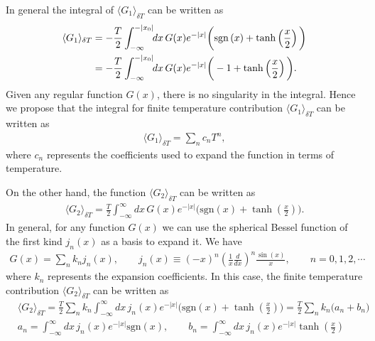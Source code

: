 \documentclass[sn-mathphys,Numbered]{sn-jnl}
\begin{document}
In general the integral of $\langle G_1\rangle_{\delta T}$ can be written as
\begin{align}
\langle G_1\rangle_{\delta T}&=-\frac{T}{2}\int^{-|x_0|}_{-\infty}\!\!dx\,G(x) e^{-|x|}\bigg(\mathrm{sgn}\left(x\right)+\tanh\left(\frac{x}{2}\right)\bigg)\notag\\
&=-\frac{T}{2}\int^{-|x_0|}_{-\infty}\!\!dx\,G(x) e^{-|x|}\bigg(-1+\tanh\left(\frac{x}{2}\right)\bigg).
\end{align}
 Given any regular function $G(x)$, there is no singularity in the integral. Hence we propose that the integral for finite temperature contribution $\langle G_1\rangle_{\delta T}$ can be written as
\begin{align}\label{finite expansion}
\langle G_1\rangle_{\delta T}=\sum_{n}c_nT^n,
\end{align}
where $c_n$ represents the coefficients used to expand the function in terms of temperature.



On the other hand, the function $\langle G_2\rangle_{\delta T}$ can be written as 
\begin{align}
\langle G_2\rangle_{\delta T}=\frac{T}{2}\int^{\infty}_{-\infty}\!\!dx\,G(x) e^{-|x|}\bigg(\mathrm{sgn}\left(x\right)+\tanh\left(\frac{x}{2}\right)\bigg).
\end{align}
In general, for any function $G(x)$ we can use the spherical Bessel function of the first kind $j_n(x)$ as a basis to expand it. We have
\begin{align}
G(x)=\sum_{n}k_nj_n(x),\qquad
j_n(x)\equiv(-x)^n\left(\frac{1}{x}\frac{d}{dx}\right)^{\!\!n}\frac{\sin(x)}{x},\qquad n=0,1,2,\cdots
\end{align}
where $k_n$ represents the expansion coefficients. In this case, the finite temperature contribution $\langle G_2\rangle_{\delta T}$ can be written as
\begin{align}
&\langle G_2\rangle_{\delta T}\!=\!\frac{T}{2}\sum_n k_n\int^{\infty}_{-\infty}\!\!\!\!dx\,j_n(x) e^{-|x|}\bigg(\mathrm{sgn}\left(x\right)+\tanh\left(\frac{x}{2}\right)\!\!\bigg)\!\!=\frac{T}{2}\sum_n k_n\bigg(a_n+b_n\bigg)\\
&a_n=\int^{\infty}_{-\infty}\!\!\!\!dx\,j_n(x) e^{-|x|}\mathrm{sgn}\left(x\right),\qquad b_n=\int^{\infty}_{-\infty}\!\!\!\!dx\,j_n(x) e^{-|x|}\tanh\left(\frac{x}{2}\right)
\end{align}
\end{document}
